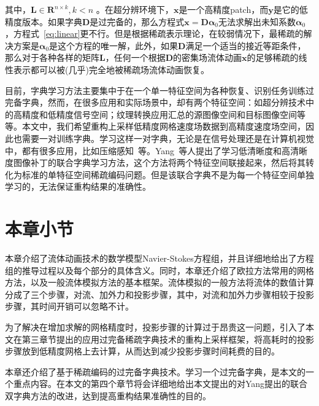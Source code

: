 其中，$\boldsymbol L \in {\boldsymbol R}^{n \times k}, k < n$ 。在超分辨环境下，$\boldsymbol x$是一个高精度patch，而$\boldsymbol y$是它的低精度版本。如果字典$ {\boldsymbol D}$是过完备的，那么方程式$\boldsymbol x = \boldsymbol {D \alpha}_0$无法求解出未知系数$\boldsymbol \alpha_0$，方程式~\ref{eq:linear}更不行。但是根据稀疏表示理论，在较弱情况下，最稀疏的解决方案是$\boldsymbol \alpha_0$是这个方程的唯一解，此外，如果$ {\boldsymbol D}$满足一个适当的接近等距条件，那么对于各种各样的矩阵$\boldsymbol  L$，任何一个根据$ {\boldsymbol D}$的密集场流体动画$\boldsymbol x$的足够稀疏的线性表示都可以被(几乎)完全地被稀疏场流体动画恢复。

目前，字典学习方法主要集中于在一个单一特征空间为各种恢复、识别任务训练过完备字典，然而，在很多应用和实际场景中，却有两个特征空间：如超分辨技术中的高精度和低精度信号空间；纹理转换应用汇总的源图像空间和目标图像空间等等。本文中，我们希望重构上采样低精度网格速度场数据到高精度速度场空间，因此也需要一对训练字典。学习这样一对字典，无论是在信号处理还是在计算机视觉中，都有很多应用，比如压缩感知~\cite{donoho2006compressed}等。Yang~\cite{yang2012coupled}等人提出了学习低清晰度和高清晰度图像补丁的联合字典学习方法，这个方法将两个特征空间联接起来，然后将其转化为标准的单特征空间稀疏编码问题。但是该联合字典不是为每一个特征空间单独学习的，无法保证重构结果的准确性。

\section{本章小节}

本章介绍了流体动画技术的数学模型Navier-Stokes方程组，并且详细地给出了方程组的推导过程以及每个部分的具体含义。同时，本章还介绍了欧拉方法常用的网格方法，以及一般流体模拟方法的基本框架。流体模拟的一般方法将流体的数值计算分成了三个步骤，对流、加外力和投影步骤，其中，对流和加外力步骤相较于投影步骤，其时间开销可以忽略不计。

为了解决在增加求解的网格精度时，投影步骤的计算过于昂贵这一问题，引入了本文在第三章节提出的应用过完备稀疏字典技术的重构上采样框架，将高耗时的投影步骤放到低精度网格上去计算，从而达到减少投影步骤时间耗费的目的。

本章还介绍了基于稀疏编码的过完备字典技术。学习一个过完备字典，是本文的一个重点内容。在本文的第四个章节将会详细地给出本文提出的对Yang提出的联合双字典方法的改进，达到提高重构结果准确性的目的。